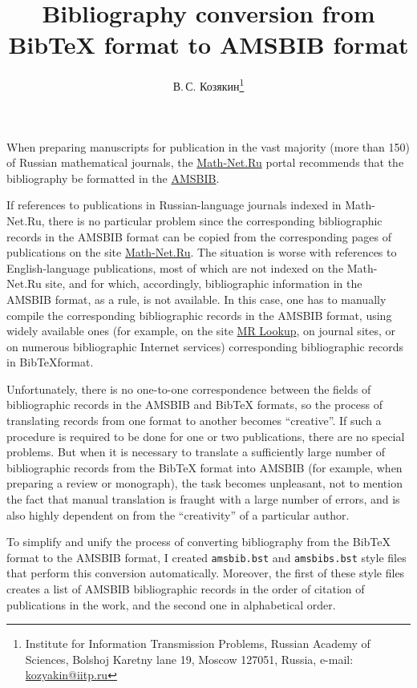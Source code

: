 \documentclass[a4paper]{article}
\title{Bibliography conversion from Bib\TeX{} format to AMSBIB format}
\author{В.\,С. Козякин\thanks{Institute for Information Transmission Problems, Russian Academy of Sciences, Bolshoj Karetny lane 19, Moscow 127051, Russia,
e-mail: \href{mailto:kozyakin@iitp.ru}{kozyakin@iitp.ru}}}
\begin{document}
\maketitle

When preparing manuscripts for publication in the vast majority (more than 150) of Russian mathematical journals, the \href{https://www.mathnet.ru/index.phtml?&option_lang=eng}{Math-Net.Ru} portal recommends that the bibliography be formatted in the \href{https://www.mathnet.ru/poffice/amsbibpackage.phtml?wshow=amsbibpackage&option_lang=eng}{AMSBIB}.

If references to publications in Russian-language journals indexed in Math-Net.Ru, there is no particular problem since the corresponding bibliographic records in the AMSBIB format can be copied from the corresponding pages of publications on the site \href{https://www.mathnet.ru/index.phtml?&option_lang=eng}{Math-Net.Ru}. The situation is worse with references to English-language publications, most of which are not indexed on the Math-Net.Ru site, and for which, accordingly, bibliographic information in the AMSBIB format, as a rule, is not available. In this case, one has to manually compile the corresponding bibliographic records in the AMSBIB format, using widely available ones (for example, on the site \href{https://mathscinet.ams.org/mrlookup}{MR Lookup}, on journal sites, or on numerous bibliographic Internet services) corresponding bibliographic records in Bib\TeX format.

Unfortunately, there is no one-to-one correspondence between the fields of bibliographic records in the AMSBIB and Bib\TeX{} formats, so the process of translating records from one format to another becomes ``creative''. If such a procedure is required to be done for one or two publications, there are no special problems. But when it is necessary to translate a sufficiently large number of bibliographic records from the Bib\TeX{} format into AMSBIB (for example, when preparing a review or monograph), the task becomes unpleasant, not to mention the fact that manual translation is fraught with a large number of errors, and is also highly dependent on from the ``creativity'' of a particular author.

To simplify and unify the process of converting bibliography from the Bib\TeX{} format to the AMSBIB format, I created \texttt{amsbib.bst} and \texttt{amsbibs.bst} style files that perform this conversion automatically. Moreover, the first of these style files creates a list of AMSBIB bibliographic records in the order of citation of publications in the work, and the second one in alphabetical order.
\end{document}
